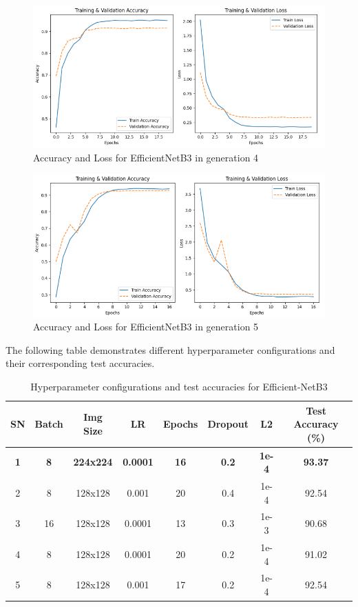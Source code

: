 \begin{figure}[htbp]
      \centering
      \includegraphics[scale=0.45]{images/GA_EfficientNet4.png}
      \caption{Accuracy and Loss for EfficientNetB3 in generation 4}
\end{figure}
\begin{figure}[htbp]
      \centering
      \includegraphics[scale=0.45]{images/GA_EfficientNet5.png}
      \caption{Accuracy and Loss for EfficientNetB3 in generation 5}
\end{figure}

\clearpage 

The following table demonstrates different hyperparameter configurations and their corresponding test accuracies.

\begin{table}[h!]
      \centering
      \begin{tabular}{|c|c|c|c|c|c|c|c|}
          \hline
          \textbf{SN} & 
          \textbf{Batch} & \textbf{Img Size} & \textbf{LR} & \textbf{Epochs} & \textbf{Dropout} & \textbf{L2} & \textbf{Test Accuracy (\%)} \\
          \hline
          \textbf{1} & \textbf{8}   & \textbf{224x224} & \textbf{0.0001}  & \textbf{16}  & \textbf{0.2}  & \textbf{1e-4}  & \textbf{93.37} \\
          2 & 8   & 128x128 & 0.001   & 20  & 0.4  & 1e-4  & 92.54 \\
          3 & 16  & 128x128 & 0.0001  & 13  & 0.3  & 1e-3  & 90.68 \\
          4 & 8   & 128x128 & 0.0001  & 20  & 0.2  & 1e-4  & 91.02 \\
          5 & 8   & 128x128 & 0.001   & 17  & 0.2  & 1e-4  & 92.54 \\
          \hline
      \end{tabular}
      \caption{Hyperparameter configurations and test accuracies for Efficient-NetB3}
\end{table}

